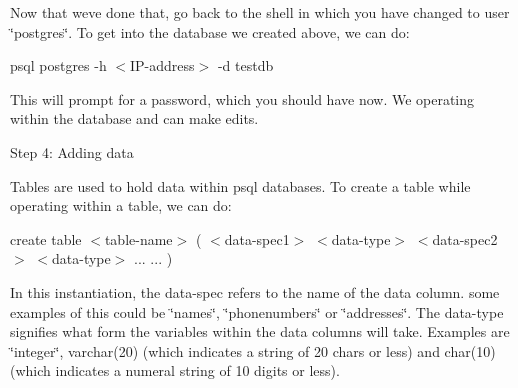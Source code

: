 Now that we\textquotesingle{}ve done that, go back to the shell in which you have changed to user \char`\"{}postgres\char`\"{}. To get into the database we created above, we can do\+:

psql postgres -\/h $<$I\+P-\/address$>$ -\/d testdb

This will prompt for a password, which you should have now. We operating within the database and can make edits.

Step 4\+: Adding data

Tables are used to hold data within psql databases. To create a table while operating within a table, we can do\+:

create table $<$table-\/name$>$ ( $<$data-\/spec1$>$ $<$data-\/type$>$ $<$data-\/spec2$>$ $<$data-\/type$>$ ... ... )

In this instantiation, the data-\/spec refers to the name of the data column. some examples of this could be \char`\"{}names\char`\"{}, \char`\"{}phonenumbers\char`\"{} or \char`\"{}addresses\char`\"{}. The data-\/type signifies what form the variables within the data columns will take. Examples are \char`\"{}integer\char`\"{}, varchar(20) (which indicates a string of 20 chars or less) and char(10) (which indicates a numeral string of 10 digits or less). 